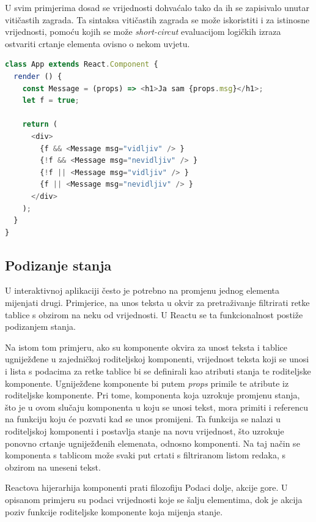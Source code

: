 \documentclass[times, utf8, zavrsni, numeric]{fer}
\newcommand{\razmakp}{\vspace{18pt}}
\newcommand{\razmaks}{\vspace{10pt}}
\begin{document}
U svim primjerima dosad se vrijednosti dohvaćalo tako da ih se zapisivalo unutar vitičastih zagrada.
Ta sintaksa vitičastih zagrada se može iskoristiti i za istinosne vrijednosti, pomoću kojih se može \emph{short-circut} evaluacijom logičkih izraza ostvariti crtanje elementa ovisno o nekom uvjetu.

\razmakp
\begin{lstlisting}[language=JavaScript, caption={Uvjetno crtanje elementa}]
class App extends React.Component {
  render () {
    const Message = (props) => <h1>Ja sam {props.msg}</h1>;
    let f = true;
    
    return (
      <div>
        {f && <Message msg="vidljiv" /> }
        {!f && <Message msg="nevidljiv" /> }
        {!f || <Message msg="vidljiv" /> }
        {f || <Message msg="nevidljiv" /> }
      </div>
    );
  }
}
\end{lstlisting}
\razmaks


\subsection{Podizanje stanja} \label{sec:lifting_state}

U interaktivnoj aplikaciji često je potrebno na promjenu jednog elementa mijenjati drugi.
Primjerice, na unos teksta u okvir za pretraživanje filtrirati retke tablice s obzirom na neku od vrijednosti.
U Reactu se ta funkcionalnost postiže podizanjem stanja.\citep{reactDocsLiftStateUp}

Na istom tom primjeru, ako su komponente okvira za unost teksta i tablice ugniježđene u zajedničkoj roditeljskoj komponenti, vrijednost teksta koji se unosi i lista s podacima za retke tablice bi se definirali kao atributi stanja te roditeljske komponente.
Ugniježđene komponente bi putem \emph{props} primile te atribute iz roditeljske komponente.
Pri tome, komponenta koja uzrokuje promjenu stanja, što je u ovom slučaju komponenta u koju se unosi tekst, mora primiti i referencu na funkciju koju će pozvati kad se unos promijeni.
Ta funkcija se nalazi u roditeljskoj komponenti i postavlja stanje na novu vrijednost, što uzrokuje ponovno crtanje ugniježđenih elemenata, odnosno komponenti.
Na taj način se komponenta s tablicom može svaki put crtati s filtriranom listom redaka, s obzirom na uneseni tekst.

Reactova hijerarhija komponenti prati filozofiju \glqq Podaci dolje, akcije gore\grqq \break {}.
U opisanom primjeru su podaci vrijednosti koje se šalju elementima, dok je akcija poziv funkcije roditeljske komponente koja mijenja stanje.
\end{document}
